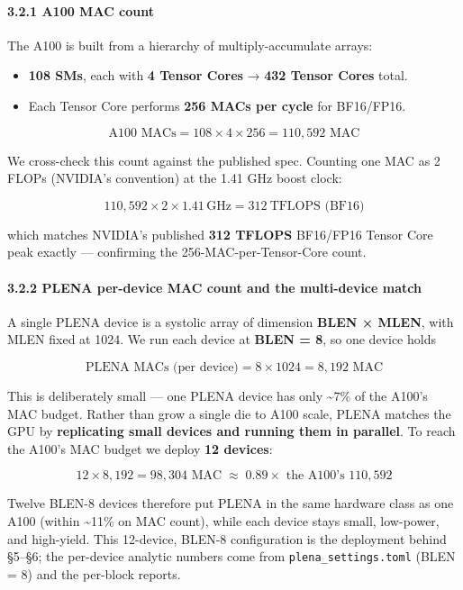 \documentclass[
  10pt,
]{article}
\providecommand{\tightlist}{%
  \setlength{\itemsep}{0pt}\setlength{\parskip}{0pt}}
\begin{document}
\paragraph{3.2.1 A100 MAC count}\label{a100-mac-count}

The A100 is built from a hierarchy of multiply-accumulate arrays:

\begin{itemize}
\tightlist
\item
  \textbf{108 SMs}, each with \textbf{4 Tensor Cores} → \textbf{432
  Tensor Cores} total.
\item
  Each Tensor Core performs \textbf{256 MACs per cycle} for BF16/FP16.
\end{itemize}

\[\text{A100 MACs} = 108 \times 4 \times 256 = 110{,}592 \text{ MAC}\]

We cross-check this count against the published spec. Counting one MAC
as 2 FLOPs (NVIDIA's convention) at the 1.41 GHz boost clock:

\[110{,}592 \times 2 \times 1.41\,\text{GHz} = 312\ \text{TFLOPS (BF16)}\]

which matches NVIDIA's published \textbf{312 TFLOPS} BF16/FP16 Tensor
Core peak exactly --- confirming the 256-MAC-per-Tensor-Core count.

\paragraph{3.2.2 PLENA per-device MAC count and the multi-device
match}\label{plena-per-device-mac-count-and-the-multi-device-match}

A single PLENA device is a systolic array of dimension \textbf{BLEN ×
MLEN}, with MLEN fixed at 1024. We run each device at \textbf{BLEN = 8},
so one device holds

\[\text{PLENA MACs (per device)} = 8 \times 1024 = 8{,}192 \text{ MAC}\]

This is deliberately small --- one PLENA device has only
\textasciitilde7\% of the A100's MAC budget. Rather than grow a single
die to A100 scale, PLENA matches the GPU by \textbf{replicating small
devices and running them in parallel}. To reach the A100's MAC budget we
deploy \textbf{12 devices}:

\[12 \times 8{,}192 = 98{,}304 \text{ MAC} \;\approx\; 0.89\times \text{ the A100's } 110{,}592\]

Twelve BLEN-8 devices therefore put PLENA in the same hardware class as
one A100 (within \textasciitilde11\% on MAC count), while each device
stays small, low-power, and high-yield. This 12-device, BLEN-8
configuration is the deployment behind §5--§6; the per-device analytic
numbers come from \texttt{plena\_settings.toml} (BLEN = 8) and the
per-block reports.
\end{document}
